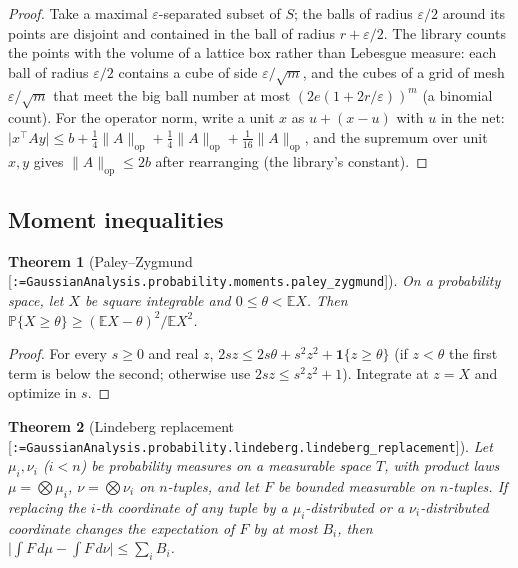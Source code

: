 \documentclass[11pt]{article}
\makeatletter
\newcommand{\formal@break}[1]{\@tfor\formal@tok:=#1\do{%
  \formal@tok
  \expandafter\ifx\formal@tok.\allowbreak\else
  \expandafter\ifx\formal@tok\_\allowbreak\fi\fi}}
\DeclareRobustCommand{\formal}[1]{\textnormal{[\texttt{\small\formal@break{#1}}]}}
\newcommand{\E}{\mathbb{E}}
\newcommand{\Prob}{\mathbb{P}}
\newcommand{\norm}[1]{\lVert #1\rVert}
\newcommand{\abs}[1]{\lvert #1\rvert}
\newcommand{\op}{\mathrm{op}}
\newcommand{\one}{\mathbf{1}}
\theoremstyle{plain}
\newtheorem{theorem}{Theorem}[section]
\theoremstyle{definition}
\makeatother
\begin{document}
\begin{proof}
Take a maximal $\varepsilon$-separated subset of $S$; the balls of radius
$\varepsilon/2$ around its points are disjoint and contained in the ball of
radius $r + \varepsilon/2$. The library counts the points with the volume
of a lattice box rather than Lebesgue measure: each ball of radius
$\varepsilon/2$ contains a cube of side $\varepsilon/\sqrt m$, and the cubes
of a grid of mesh $\varepsilon/\sqrt m$ that meet the big ball number at most
$(2e(1 + 2r/\varepsilon))^m$ (a binomial count). For the operator norm, write
a unit $x$ as $u + (x - u)$ with $u$ in the net: $\abs{x^{\top}Ay} \le b + \frac14\norm{A}_\op + \frac14 \norm{A}_\op + \frac1{16}\norm{A}_\op$,
and the supremum over unit $x, y$ gives $\norm{A}_\op \le 2b$ after
rearranging (the library's constant).
\end{proof}

\subsection{Moment inequalities}

\begin{theorem}[Paley--Zygmund \formal{GaussianAnalysis.probability.moments.paley\_zygmund}]\label{thm:pz}
On a probability space, let $X$ be square integrable and $0 \le \theta < \E X$.
Then $\Prob\{X \ge \theta\} \ge (\E X - \theta)^2 / \E X^2$.
\end{theorem}

\begin{proof}
For every $s \ge 0$ and real $z$, $2sz \le 2s\theta + s^2 z^2 + \one\{z \ge \theta\}$
(if $z < \theta$ the first term is below the second; otherwise use
$2sz \le s^2z^2 + 1$). Integrate at $z = X$ and optimize in $s$.
\end{proof}

\begin{theorem}[Lindeberg replacement \formal{GaussianAnalysis.probability.lindeberg.lindeberg\_replacement}]\label{thm:lindeberg}
Let $\mu_i, \nu_i$ ($i < n$) be probability measures on a measurable space
$T$, with product laws $\mu = \bigotimes \mu_i$, $\nu = \bigotimes \nu_i$ on
$n$-tuples, and let $F$ be bounded measurable on $n$-tuples. If replacing
the $i$-th coordinate of any tuple by a $\mu_i$-distributed or a
$\nu_i$-distributed coordinate changes the expectation of $F$ by at most
$B_i$, then $\abs{\int F\, d\mu - \int F\, d\nu} \le \sum_i B_i$.
\end{theorem}
\end{document}

